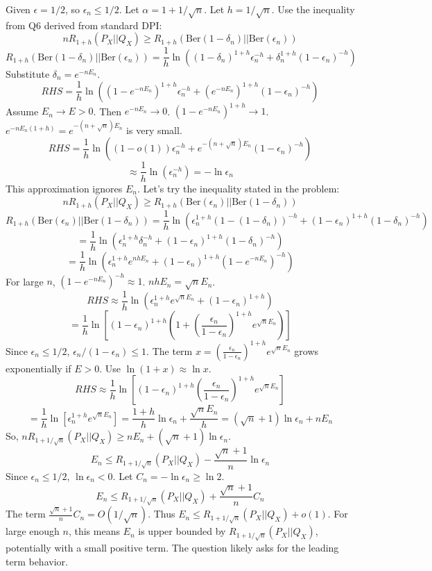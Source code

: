 \documentclass{article}
\begin{document}
Given $\epsilon = 1/2$, so $\epsilon_n \le 1/2$. Let $\alpha = 1 + 1/\sqrt{n}$. Let $h=1/\sqrt{n}$. Use the inequality from Q6 derived from standard DPI:
\[ n R_{1+h}(P_X||Q_X) \ge R_{1+h}(\text{Ber}(1-\delta_n)||\text{Ber}(\epsilon_n)) \]
\[ R_{1+h}(\text{Ber}(1-\delta_n)||\text{Ber}(\epsilon_n)) = \frac{1}{h} \ln \left( (1-\delta_n)^{1+h} \epsilon_n^{-h} + \delta_n^{1+h} (1-\epsilon_n)^{-h} \right) \]
Substitute $\delta_n = e^{-n E_n}$.
\[ RHS = \frac{1}{h} \ln \left( (1-e^{-n E_n})^{1+h} \epsilon_n^{-h} + (e^{-n E_n})^{1+h} (1-\epsilon_n)^{-h} \right) \]
Assume $E_n \to E > 0$. Then $e^{-n E_n} \to 0$. $(1-e^{-n E_n})^{1+h} \to 1$.
$e^{-n E_n(1+h)} = e^{-(n+\sqrt{n})E_n}$ is very small.
\[ RHS = \frac{1}{h} \ln \left( (1-o(1)) \epsilon_n^{-h} + e^{-(n+\sqrt{n})E_n} (1-\epsilon_n)^{-h} \right) \]
\[ \approx \frac{1}{h} \ln (\epsilon_n^{-h}) = -\ln \epsilon_n \]
This approximation ignores $E_n$. Let's try the inequality stated in the problem:
\[ n R_{1+h}(P_X||Q_X) \ge R_{1+h}(\text{Ber}(\epsilon_n)||\text{Ber}(1-\delta_n)) \]
\[ R_{1+h}(\text{Ber}(\epsilon_n)||\text{Ber}(1-\delta_n)) = \frac{1}{h} \ln( \epsilon_n^{1+h} (1-(1-\delta_n))^{-h} + (1-\epsilon_n)^{1+h} (1-\delta_n)^{-h} ) \]
\[ = \frac{1}{h} \ln( \epsilon_n^{1+h} \delta_n^{-h} + (1-\epsilon_n)^{1+h} (1-\delta_n)^{-h} ) \]
\[ = \frac{1}{h} \ln( \epsilon_n^{1+h} e^{nhE_n} + (1-\epsilon_n)^{1+h} (1-e^{-nE_n})^{-h} ) \]
For large $n$, $(1-e^{-nE_n})^{-h} \approx 1$. $nhE_n = \sqrt{n} E_n$.
\[ RHS \approx \frac{1}{h} \ln( \epsilon_n^{1+h} e^{\sqrt{n}E_n} + (1-\epsilon_n)^{1+h} ) \]
\[ = \frac{1}{h} \ln [ (1-\epsilon_n)^{1+h} ( 1 + (\frac{\epsilon_n}{1-\epsilon_n})^{1+h} e^{\sqrt{n}E_n} ) ] \]
Since $\epsilon_n \le 1/2$, $\epsilon_n/(1-\epsilon_n) \le 1$. The term $x = (\frac{\epsilon_n}{1-\epsilon_n})^{1+h} e^{\sqrt{n}E_n}$ grows exponentially if $E>0$. Use $\ln(1+x) \approx \ln x$.
\[ RHS \approx \frac{1}{h} \ln [ (1-\epsilon_n)^{1+h} (\frac{\epsilon_n}{1-\epsilon_n})^{1+h} e^{\sqrt{n}E_n} ] \]
\[ = \frac{1}{h} \ln [ \epsilon_n^{1+h} e^{\sqrt{n}E_n} ] = \frac{1+h}{h} \ln \epsilon_n + \frac{\sqrt{n}E_n}{h} = (\sqrt{n}+1) \ln \epsilon_n + n E_n \]
So, $n R_{1+1/\sqrt{n}}(P_X||Q_X) \ge n E_n + (\sqrt{n}+1) \ln \epsilon_n$.
\[ E_n \le R_{1+1/\sqrt{n}}(P_X||Q_X) - \frac{\sqrt{n}+1}{n} \ln \epsilon_n \]
Since $\epsilon_n \le 1/2$, $\ln \epsilon_n < 0$. Let $C_n = -\ln \epsilon_n \ge \ln 2$.
\[ E_n \le R_{1+1/\sqrt{n}}(P_X||Q_X) + \frac{\sqrt{n}+1}{n} C_n \]
The term $\frac{\sqrt{n}+1}{n} C_n = O(1/\sqrt{n})$. Thus $E_n \le R_{1+1/\sqrt{n}}(P_X||Q_X) + o(1)$.
For large enough $n$, this means $E_n$ is upper bounded by $R_{1+1/\sqrt{n}}(P_X||Q_X)$, potentially with a small positive term. The question likely asks for the leading term behavior.
\end{document}
